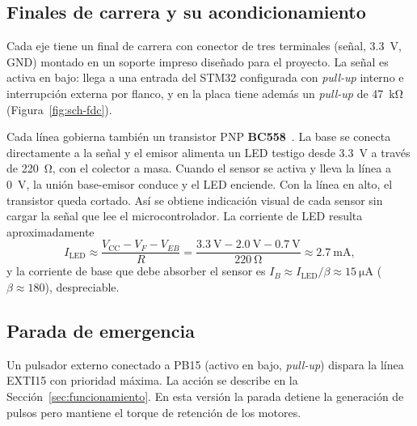 \subsection{Finales de carrera y su acondicionamiento}
Cada eje tiene un final de carrera con conector de tres terminales (señal, \SI{3,3}{\volt},
GND) montado en un soporte impreso diseñado para el proyecto. La señal es activa en bajo:
llega a una entrada del STM32 configurada con \emph{pull-up} interno e interrupción externa por
flanco, y en la placa tiene además un \emph{pull-up} de \SI{47}{\kilo\ohm} (Figura~\ref{fig:sch-fdc}).

Cada línea gobierna también un transistor PNP \textbf{BC558}~\cite{bc558}. La base se conecta
directamente a la señal y el emisor alimenta un LED testigo desde \SI{3,3}{\volt} a través de
\SI{220}{\ohm}, con el colector a masa. Cuando el sensor se activa y lleva la línea a
\SI{0}{\volt}, la unión base-emisor conduce y el LED enciende. Con la línea en alto, el
transistor queda cortado. Así se obtiene indicación visual de cada sensor sin cargar la señal
que lee el microcontrolador. La corriente de LED resulta aproximadamente
\begin{equation}
  I_{\mathrm{LED}} \approx \frac{V_{\mathrm{CC}} - V_{F} - V_{EB}}{R}
  = \frac{\SI{3,3}{\volt} - \SI{2,0}{\volt} - \SI{0,7}{\volt}}{\SI{220}{\ohm}}
  \approx \SI{2,7}{\milli\ampere},
\end{equation}
y la corriente de base que debe absorber el sensor es $I_B \approx I_{\mathrm{LED}}/\beta
\approx \SI{15}{\micro\ampere}$ ($\beta\approx180$), despreciable.



\subsection{Parada de emergencia}
Un pulsador externo conectado a PB15 (activo en bajo, \emph{pull-up}) dispara la línea EXTI15
con prioridad máxima. La acción se describe en la Sección~\ref{sec:funcionamiento}. En esta
versión la parada detiene la generación de pulsos pero mantiene el torque de retención de los
motores.

